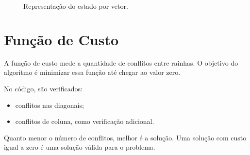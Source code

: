 \documentclass[12pt,a4paper]{article}
\newcommand{\desenharTabuleiro}{
    \foreach \linha in {0,...,3} {
        \foreach \coluna in {0,...,3} {
            \pgfmathtruncatemacro{\cor}{mod(\linha+\coluna,2)}
            \ifnum\cor=0
                \fill[casaClara] (\coluna,-\linha) rectangle ++(1,-1);
            \else
                \fill[casaEscura] (\coluna,-\linha) rectangle ++(1,-1);
            \fi
        }
    }
    \draw[texto, line width=0.7pt] (0,0) rectangle (4,-4);
    \foreach \i in {1,2,3} {
        \draw[black!20] (\i,0) -- (\i,-4);
        \draw[black!20] (0,-\i) -- (4,-\i);
    }
}
\newcommand{\rainha}[2]{
    \node[rainha] at ({#2+0.5},{-#1-0.5}) {Q};
}
\begin{document}
\begin{figure}[H]
\centering
{}
\caption{Representação do estado por vetor.}
\end{figure}

\section{Função de Custo}

A função de custo mede a quantidade de conflitos entre rainhas. O objetivo do algoritmo é minimizar essa função até chegar ao valor zero.

No código, são verificados:

\begin{itemize}
    \item conflitos nas diagonais;
    \item conflitos de coluna, como verificação adicional.
\end{itemize}

Quanto menor o número de conflitos, melhor é a solução. Uma solução com custo igual a zero é uma solução válida para o problema.
\end{document}
